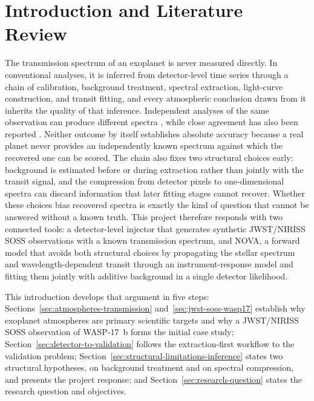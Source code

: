 \section{Introduction and Literature Review}
\label{sec:introduction}

The transmission spectrum of an exoplanet is never measured directly. In
conventional analyses, it is inferred from detector-level time series through
a chain of calibration, background treatment, spectral extraction, light-curve
construction, and transit fitting, and every atmospheric conclusion drawn from
it inherits the quality of that inference. Independent analyses of the same
observation can produce different spectra
\citep{ConstantinouEtAl2023,KirkEtAl2024}, while
close agreement has also been reported \citep{LouieEtAl2025}. Neither outcome
by itself establishes absolute accuracy because a real planet never provides
an independently known spectrum against which the recovered one can be scored.
The chain also fixes two structural choices early: background is
estimated before or during extraction rather than jointly with the transit
signal, and the compression from detector pixels to one-dimensional spectra
can discard information that later fitting stages cannot recover. Whether
these choices bias recovered spectra is exactly the kind of question that
cannot be answered without a known truth. This project therefore responds
with two connected tools: a detector-level injector that generates synthetic
JWST/NIRISS SOSS observations with a known transmission spectrum, and NOVA, a
forward model that avoids both structural choices by propagating the stellar
spectrum and wavelength-dependent transit through an instrument-response
model and fitting them jointly with additive background in a single detector
likelihood.

This introduction develops that argument in five steps:
Sections~\ref{sec:atmospheres-transmission}
and~\ref{sec:jwst-soss-wasp17} establish why exoplanet atmospheres are primary
scientific targets and why a JWST/NIRISS SOSS observation of WASP-17~b forms the
initial case study; Section~\ref{sec:detector-to-validation} follows the
extraction-first workflow to the validation problem;
Section~\ref{sec:structural-limitations-inference} states two structural
hypotheses, on background treatment and on spectral compression, and presents
the project response; and
Section~\ref{sec:research-question} states the research question and
objectives.
